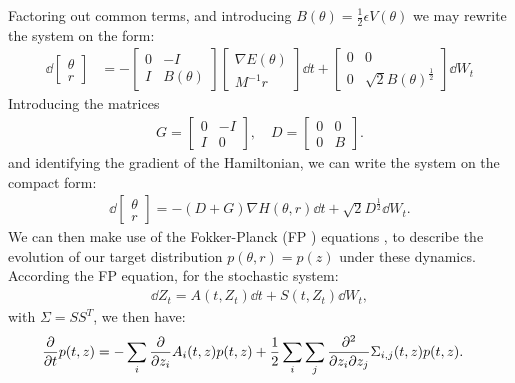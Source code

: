 Factoring out common terms, and introducing $B(\theta) = \frac{1}{2}\epsilon V(\theta)$ we may rewrite the system on the form:
\begin{align}
    \dd{\begin{bmatrix}\theta \\ r \end{bmatrix}} &= 
    -\begin{bmatrix}
        0 & -I \\ 
        I & B(\theta)
    \end{bmatrix} \begin{bmatrix}
        \nabla{E}(\theta)  \\ M^{-1}r
    \end{bmatrix}\dd{t} + \begin{bmatrix}
        0 & 0 \\ 
        0 & \sqrt{2} B(\theta)^{\frac{1}{2}}
    \end{bmatrix} \dd{W_t} 
\end{align}
Introducing the matrices
\begin{align} \label{eq:stoch-hmc-matrix-defs}
    G=\begin{bmatrix}0 & -I \\ I & 0 \end{bmatrix},\quad 
    D = \begin{bmatrix}
        0 & 0 \\ 
        0 & B
    \end{bmatrix}.
\end{align}
and identifying the gradient of the Hamiltonian, we can write the system on the compact form: 
\begin{align}
    \dd{\begin{bmatrix}\theta \\ r\end{bmatrix}}= - (D+G) \nabla H(\theta, r)\dd{t} + \sqrt{2}D^{\frac{1}{2}} \dd{W_t}.
\end{align}
We can then make use of the Fokker-Planck (FP ) equations \autocite{ottinger_stochastic_1996}, to describe the evolution of our target distribution $p(\theta, r)=p(z)$ under these dynamics. 
According the FP equation, for the stochastic  system:
\begin{align}
    \dd{Z_t} =A(t, Z_t) \dd{t}+ S(t, Z_t)\dd{W_t},
\end{align}
with $\Sigma=SS^T$, we then have:
\begin{align}
    \pdv{t} p(t, z) &= - \sum_{i} \pdv{z_i} A_i(t, z) p(t, z) 
    + \frac{1}{2}\sum_{i}\sum_{j}\pdv{}{z_i}{z_j}\Sigma_{i,j}(t, z)p(t, z). 
\end{align}
